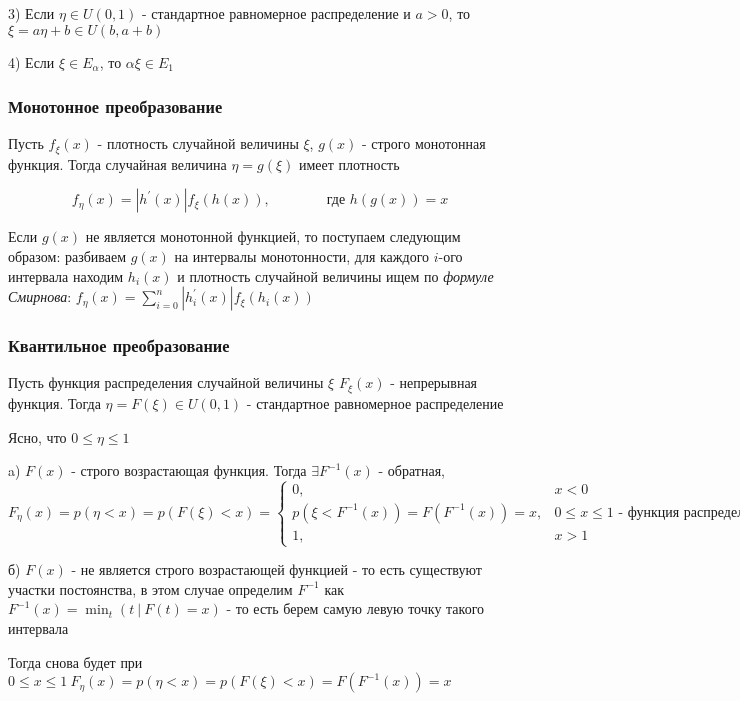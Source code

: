 \documentclass[12pt]{article}
\begin{document}
    3) Если $\eta \in U(0, 1)$ - стандартное равномерное распределение и $a > 0$, то $\xi = a\eta + b \in U(b, a + b)$

    4) Если $\xi \in E_\alpha$, то $\alpha \xi \in E_1$

    \subsubsection{Монотонное преобразование}

    \hypertarget{monotonoustransformationtheorem}{}

    \begin{MyTheorem}
        \Ths Пусть $f_\xi(x)$ - плотность случайной величины $\xi$, $g(x)$ - строго монотонная функция. Тогда 
        случайная величина $\eta = g(\xi)$ имеет плотность

        \[f_\eta(x) = |h^\prime(x)| f_\xi(h(x)), \qquad\qquad \text{где } h(g(x)) = x\]
    \end{MyTheorem}

    Если $g(x)$ не является монотонной функцией, то поступаем следующим образом: разбиваем $g(x)$ на интервалы монотонности, 
    для каждого $i$-ого интервала находим $h_i(x)$ и плотность случайной величины ищем по \textit{формуле Смирнова}: 
    $f_\eta(x) = \sum_{i = 0}^n |h_i^\prime(x)| f_\xi(h_i(x))$
    
    \hypertarget{quantiletransformation}{}

    \subsubsection{Квантильное преобразование}

    \begin{MyTheorem}
         Пусть функция распределения случайной величины $\xi$ $F_\xi(x)$ - непрерывная функция. 
        Тогда $\eta = F(\xi) \in U(0, 1)$ - стандартное равномерное распределение
    \end{MyTheorem}

    \begin{MyProof}
        Ясно, что $0 \leq \eta \leq 1$

        a) $F(x)$ - строго возрастающая функция. Тогда $\exists F^{-1}(x)$ - обратная, $F_\eta(x) = p(\eta < x) = p(F(\xi) < x) = 
        \begin{cases}0, & x < 0 \\ p(\xi < F^{-1}(x)) = F(F^{-1}(x)) = x, & 0 \leq x \leq 1 \text{ - функция распределения } U(0, 1) \\ 1, & x > 1 \end{cases}$

        б) $F(x)$ - не является строго возрастающей функцией - то есть существуют участки постоянства, в этом случае
        определим $F^{-1}$ как $F^{-1}(x) = \min_{t} (t \ | \ F(t) = x)$ - то есть берем самую левую точку такого интервала

        Тогда снова будет при $0 \leq x \leq 1 \ F_\eta(x) = p(\eta < x) = p(F(\xi) < x) = F(F^{-1}(x)) = x$

    \end{MyProof}
\end{document}

